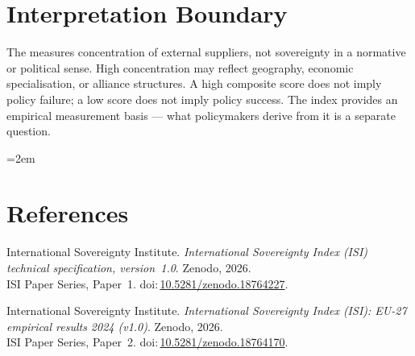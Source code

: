 \documentclass[12pt,a4paper]{article}
\begin{document}
\section{Interpretation Boundary}
\label{sec:interpretation}

The \ISI measures concentration of external suppliers, not sovereignty in a normative or political sense.  High concentration may reflect geography, economic specialisation, or alliance structures.  A high composite score does not imply policy failure; a low score does not imply policy success.  The index provides an empirical measurement basis --- what policymakers derive from it is a separate question.


\clearpage
\vspace*{1.5cm}

\begingroup\emergencystretch=2em
\section*{References}

\begin{enumerate}[label={[\arabic*]},leftmargin=2em,itemsep=6pt]
\item International Sovereignty Institute.
  \textit{International Sovereignty Index (ISI) technical specification, version~1.0}.
  Zenodo, 2026.\\ISI Paper Series, Paper~1.
  doi:\,\href{https://doi.org/10.5281/zenodo.18764227}{10.5281/zenodo.18764227}.

\item International Sovereignty Institute.
  \textit{International Sovereignty Index (ISI): EU-27 empirical results 2024 (v1.0)}.
  Zenodo, 2026.\\ISI Paper Series, Paper~2.
  doi:\,\href{https://doi.org/10.5281/zenodo.18764170}{10.5281/zenodo.18764170}.
\end{enumerate}
\endgroup
\end{document}
